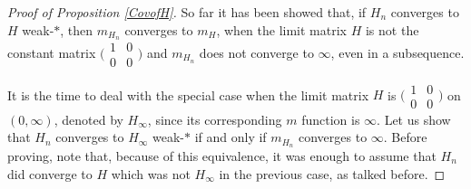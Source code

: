 \documentclass[preprint,12pt]{elsarticle}
\begin{document}
\begin{proof}[Proof of Proposition \ref{CovofH}]
 So far it has been showed that, if $H_n$ converges to $H$ weak-$\ast$, then $m_{H_n}$ converges to $m_H$, when the limit matrix $H$ is not the constant matrix $\big(\begin{smallmatrix} 1 & 0 \\ 0 & 0 \end{smallmatrix}\big)$ and $m_{H_n}$ does not converge to $\infty$, even in a subsequence.

It is the time to deal with the special case when the limit matrix $H$ is $\big( \begin{smallmatrix} 1 & 0 \\ 0 & 0 \end{smallmatrix}\big)$ on $(0,\infty)$, denoted by $H_{\infty}$, since its corresponding $m$ function is $\infty$. Let us show that $H_n$ converges to $H_{\infty}$ weak-$*$ if and only if $m_{H_n}$ converges to $\infty$. Before proving, note that, because of this equivalence, it was enough to assume that $H_n$ did converge to $H$ which was not $H_{\infty}$ in the previous case, as talked before. 


\end{proof}
\end{document}
